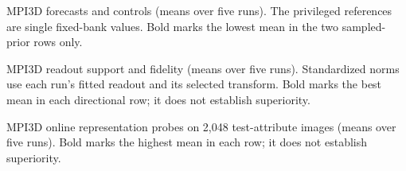 \begin{table}[htbp]
\caption{MPI3D forecasts and controls (means over five runs). The privileged references are single fixed-bank values. Bold marks the lowest mean in the two sampled-prior rows only.}
\label{tab:mpcontrols}
\centering
\small
{}
\end{table}

\begin{table}[htbp]
\caption{MPI3D readout support and fidelity (means over five runs). Standardized norms use each run's fitted readout and its selected transform. Bold marks the best mean in each directional row; it does not establish superiority.}
\label{tab:mpsupport}
\centering
\small
{}
\end{table}

\begin{table}[htbp]
\caption{MPI3D online representation probes on 2{,}048 test-attribute images (means over five runs). Bold marks the highest mean in each row; it does not establish superiority.}
\label{tab:mpprobes}
\centering
\small
{}
\end{table}
